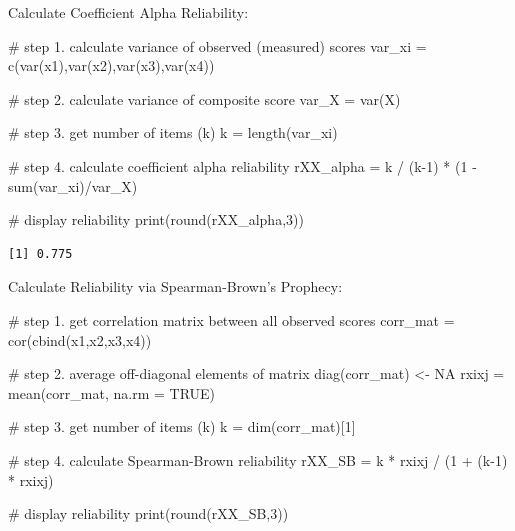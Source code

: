 \documentclass[
  letterpaper,
  DIV=11,
  numbers=noendperiod]{scrreprt}
\newenvironment{Shaded}{\begin{snugshade}}{\end{snugshade}}
\newcommand{\AttributeTok}[1]{\textcolor[rgb]{0.40,0.45,0.13}{#1}}
\newcommand{\CommentTok}[1]{\textcolor[rgb]{0.37,0.37,0.37}{#1}}
\newcommand{\ConstantTok}[1]{\textcolor[rgb]{0.56,0.35,0.01}{#1}}
\newcommand{\DecValTok}[1]{\textcolor[rgb]{0.68,0.00,0.00}{#1}}
\newcommand{\FunctionTok}[1]{\textcolor[rgb]{0.28,0.35,0.67}{#1}}
\newcommand{\NormalTok}[1]{\textcolor[rgb]{0.00,0.23,0.31}{#1}}
\newcommand{\OtherTok}[1]{\textcolor[rgb]{0.00,0.23,0.31}{#1}}
\newcommand{\SpecialCharTok}[1]{\textcolor[rgb]{0.37,0.37,0.37}{#1}}
\begin{document}
Calculate Coefficient Alpha Reliability:

\begin{Shaded}
\begin{Highlighting}[]
\CommentTok{\# step 1. calculate variance of observed (measured) scores}
\NormalTok{var\_xi }\OtherTok{=} \FunctionTok{c}\NormalTok{(}\FunctionTok{var}\NormalTok{(x1),}\FunctionTok{var}\NormalTok{(x2),}\FunctionTok{var}\NormalTok{(x3),}\FunctionTok{var}\NormalTok{(x4))}

\CommentTok{\# step 2. calculate variance of composite score}
\NormalTok{var\_X }\OtherTok{=} \FunctionTok{var}\NormalTok{(X)}

\CommentTok{\# step 3. get number of items (k)}
\NormalTok{k }\OtherTok{=} \FunctionTok{length}\NormalTok{(var\_xi)}

\CommentTok{\# step 4. calculate coefficient alpha reliability}
\NormalTok{rXX\_alpha }\OtherTok{=}\NormalTok{ k }\SpecialCharTok{/}\NormalTok{ (k}\DecValTok{{-}1}\NormalTok{) }\SpecialCharTok{*}\NormalTok{ (}\DecValTok{1} \SpecialCharTok{{-}} \FunctionTok{sum}\NormalTok{(var\_xi)}\SpecialCharTok{/}\NormalTok{var\_X)}

\CommentTok{\# display reliability}
\FunctionTok{print}\NormalTok{(}\FunctionTok{round}\NormalTok{(rXX\_alpha,}\DecValTok{3}\NormalTok{)) }
\end{Highlighting}
\end{Shaded}

\begin{verbatim}
[1] 0.775
\end{verbatim}

Calculate Reliability via Spearman-Brown's Prophecy:

\begin{Shaded}
\begin{Highlighting}[]
\CommentTok{\# step 1. get correlation matrix between all observed scores}
\NormalTok{corr\_mat }\OtherTok{=} \FunctionTok{cor}\NormalTok{(}\FunctionTok{cbind}\NormalTok{(x1,x2,x3,x4))}

\CommentTok{\# step 2. average off{-}diagonal elements of matrix}
\FunctionTok{diag}\NormalTok{(corr\_mat) }\OtherTok{\textless{}{-}} \ConstantTok{NA}
\NormalTok{rxixj }\OtherTok{=} \FunctionTok{mean}\NormalTok{(corr\_mat, }\AttributeTok{na.rm =} \ConstantTok{TRUE}\NormalTok{)}

\CommentTok{\# step 3. get number of items (k)}
\NormalTok{k }\OtherTok{=} \FunctionTok{dim}\NormalTok{(corr\_mat)[}\DecValTok{1}\NormalTok{]}

\CommentTok{\# step 4. calculate Spearman{-}Brown reliability}
\NormalTok{rXX\_SB }\OtherTok{=}\NormalTok{ k }\SpecialCharTok{*}\NormalTok{ rxixj }\SpecialCharTok{/}\NormalTok{ (}\DecValTok{1} \SpecialCharTok{+}\NormalTok{ (k}\DecValTok{{-}1}\NormalTok{) }\SpecialCharTok{*}\NormalTok{ rxixj)}

\CommentTok{\# display reliability}
\FunctionTok{print}\NormalTok{(}\FunctionTok{round}\NormalTok{(rXX\_SB,}\DecValTok{3}\NormalTok{)) }
\end{Highlighting}
\end{Shaded}
\end{document}
